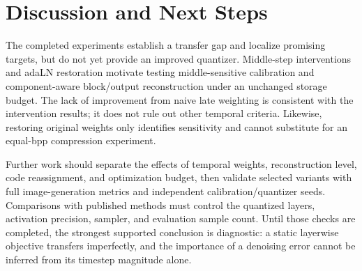 \documentclass{article}
\begin{document}
\section{Discussion and Next Steps}\label{sec:disc}

The completed experiments establish a transfer gap and localize promising targets, but do not yet provide an improved quantizer. Middle-step interventions and adaLN restoration motivate testing middle-sensitive calibration and component-aware block/output reconstruction under an unchanged storage budget. The lack of improvement from naive late weighting is consistent with the intervention results; it does not rule out other temporal criteria. Likewise, restoring original weights only identifies sensitivity and cannot substitute for an equal-bpp compression experiment.

Further work should separate the effects of temporal weights, reconstruction level, code reassignment, and optimization budget, then validate selected variants with full image-generation metrics and independent calibration/quantizer seeds. Comparisons with published methods must control the quantized layers, activation precision, sampler, and evaluation sample count. Until those checks are completed, the strongest supported conclusion is diagnostic: a static layerwise objective transfers imperfectly, and the importance of a denoising error cannot be inferred from its timestep magnitude alone.



\end{document}
